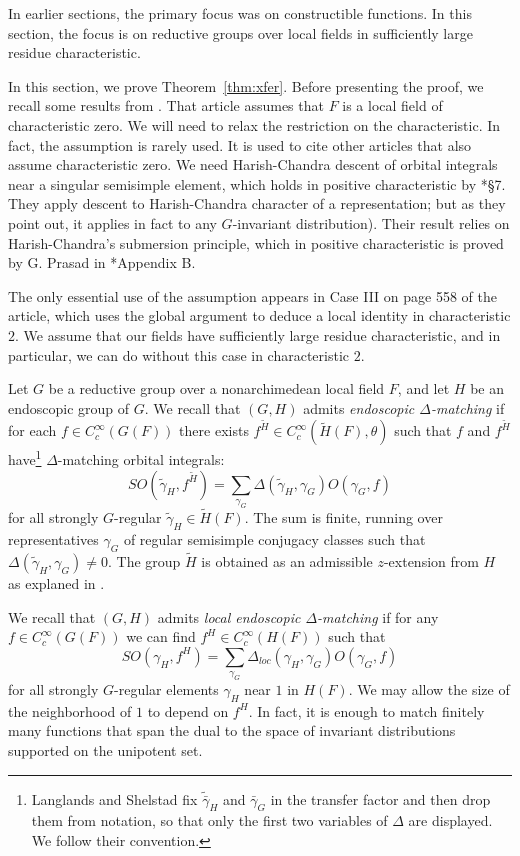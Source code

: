 \documentclass[12pt]{amsart}
\theoremstyle{plain}
\theoremstyle{definition}
\begin{document}
In earlier sections, the primary focus was on constructible
functions.  In this section, the focus is on reductive groups over
local fields in sufficiently large residue characteristic.


In this section, we prove Theorem~\ref{thm:xfer}.  Before presenting
the proof, we recall some results from \cite{LSd}.  That article
assumes that $F$ is a local field of characteristic zero.  We will
need to relax the restriction on the characteristic.  In fact, the
assumption is rarely used.  It is used to cite other articles that
also assume characteristic zero.  We need Harish-Chandra descent of
orbital integrals near a singular semisimple element, which holds in
positive characteristic by \cite{adler-korman}*{\S 7}. They
apply descent to Harish-Chandra character of a
representation; but as they point out, it applies in fact to any
$G$-invariant distribution). Their result relies on Harish-Chandra's
submersion principle, which in positive characteristic is proved by
G. Prasad in \cite{adler-debacker:mktheory}*{Appendix B}.



The only essential use of the assumption appears in Case III on page
558 of the article, which uses the global argument to deduce a local
identity in characteristic $2$.  We assume that our fields have
sufficiently large residue characteristic, and in particular, we can
do without this case in characteristic $2$.

Let $G$ be a reductive group over a nonarchimedean local field $F$,
and let $H$ be an endoscopic group of $G$.  We recall
\cite[Sec.2.1]{LSd} that $(G,H)$ admits {\it endoscopic
  $\Delta$-matching} if for each $f\in C_c^\infty(G(F))$ there exists
$f^{\tilde H}\in C_c^\infty(\tilde H(F),\theta)$ such that $f$
and $f^{\tilde H}$ have\footnote{Langlands and Shelstad fix
  $\tilde{\bar \gamma}_H$ and $\bar\gamma_G$ in the transfer factor
  and then drop them from notation, so that only the first two
  variables of $\Delta$ are displayed.  We follow their convention.}  $\Delta$-matching orbital
integrals:
\[
SO(\tilde \gamma_H,f^{\tilde H}) 
 = \sum_{\gamma_G} \Delta(\tilde\gamma_H,\gamma_G)O(\gamma_G,f)
\]
for all strongly $G$-regular $\tilde \gamma_H \in \tilde H(F)$.  The
sum is finite, running over representatives $\gamma_G$ of regular
semisimple conjugacy classes such that
$\Delta(\tilde\gamma_H,\gamma_G)\ne0$.  The group $\tilde H$ is
obtained as an admissible $z$-extension from $H$ as explaned in
\cite[Sec. 4.4]{LSxf}.

We recall that $(G,H)$ admits {\it local endoscopic $\Delta$-matching}
if for any $f\in C_c^\infty(G(F))$ we can find $f^H \in C_c^\infty(H(F))$
such that
\[
SO( \gamma_H,f^{ H}) 
 = \sum_{\gamma_G} \Delta_{loc}(\gamma_H,\gamma_G)O(\gamma_G,f)
\]
for all strongly $G$-regular elements $\gamma_H$ near $1$ in $H(F)$.
We may allow the size of the neighborhood of $1$ to depend on $f^H$.
In fact, it is enough to match finitely many functions that span the
dual to the space of invariant distributions supported on the
unipotent set.
\end{document}
